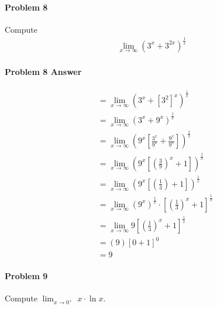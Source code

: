 \documentclass[a4paper, 11pt]{article}
\begin{document}
\paragraph{Problem 8}
Compute
\begin{align}
    \lim_{x\rightarrow \infty} \left( 3^x + 3^{2x} \right)^{\frac{1}{x}}  \nonumber
\end{align}


\paragraph{Problem 8 Answer}
\begin{align}
    &= \lim_{x\rightarrow \infty} \left( 3^x + \left[3^2\right]^x \right)^{\frac{1}{x}}  \nonumber \\
    &= \lim_{x\rightarrow \infty} \left( 3^x + 9^x \right)^{\frac{1}{x}} \nonumber \\
    &= \lim_{x\rightarrow \infty} \left( 9^x \left[ \frac{3^x}{9^x} + \frac{9^x}{9^x} \right] \right)^{\frac{1}{x}} \nonumber \\
    &= \lim_{x\rightarrow \infty} \left( 9^x \left[ \left(\frac{3}{9}\right)^x + 1 \right] \right)^{\frac{1}{x}} \nonumber \\
    &= \lim_{x\rightarrow \infty} \left( 9^x \left[ \left(\frac{1}{3}\right) + 1 \right] \right)^{\frac{1}{x}} \nonumber \\
    &= \lim_{x\rightarrow \infty} \left(9^x \right)^{\frac{1}{x}} \cdot \left[ \left(\frac{1}{3}\right)^x + 1 \right]^{\frac{1}{x}} \nonumber \\
    &= \lim_{x\rightarrow \infty} 9 \left[ \left(\frac{1}{3}\right)^x + 1 \right]^{\frac{1}{x}} \nonumber \\
    &= (9)[0 + 1]^0 \nonumber \\
    &= 9 \nonumber 
\end{align}


\paragraph{Problem 9}
Compute $\lim_{x\rightarrow 0^+} \; x \cdot \ln x$.

\end{document}

